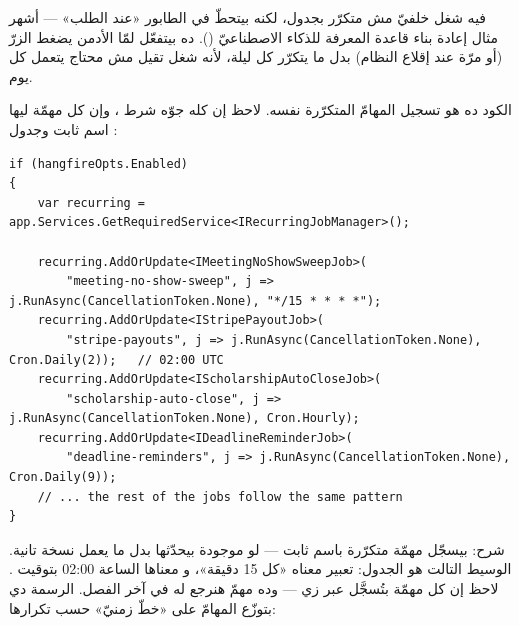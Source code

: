 \begin{note}
فيه شغل خلفيّ مش متكرّر بجدول، لكنه بيتحطّ في الطابور «عند الطلب» — أشهر مثال إعادة بناء
قاعدة المعرفة للذكاء الاصطناعيّ (). ده بيتفعّل لمّا الأدمن يضغط
الزرّ (أو مرّة عند إقلاع النظام) بدل ما يتكرّر كل ليلة، لأنه شغل تقيل مش محتاج يتعمل كل يوم.
\end{note}

الكود ده هو تسجيل المهامّ المتكرّرة نفسه. لاحظ إن كله جوّه شرط ،
وإن كل مهمّة ليها اسم ثابت وجدول :

\begin{english}
\begin{lstlisting}[language={[Sharp]C}]
if (hangfireOpts.Enabled)
{
    var recurring = app.Services.GetRequiredService<IRecurringJobManager>();

    recurring.AddOrUpdate<IMeetingNoShowSweepJob>(
        "meeting-no-show-sweep", j => j.RunAsync(CancellationToken.None), "*/15 * * * *");
    recurring.AddOrUpdate<IStripePayoutJob>(
        "stripe-payouts", j => j.RunAsync(CancellationToken.None), Cron.Daily(2));   // 02:00 UTC
    recurring.AddOrUpdate<IScholarshipAutoCloseJob>(
        "scholarship-auto-close", j => j.RunAsync(CancellationToken.None), Cron.Hourly);
    recurring.AddOrUpdate<IDeadlineReminderJob>(
        "deadline-reminders", j => j.RunAsync(CancellationToken.None), Cron.Daily(9));
    // ... the rest of the jobs follow the same pattern
}
\end{lstlisting}
\end{english}

شرح:  بيسجّل مهمّة متكرّرة باسم ثابت — لو موجودة بيحدّثها بدل ما يعمل
نسخة تانية. الوسيط التالت هو الجدول:  تعبير  معناه «كل 15
دقيقة»، و معناها الساعة 02:00 بتوقيت . لاحظ إن كل مهمّة بتُسجَّل
عبر  زي  — وده مهمّ هنرجع له في آخر الفصل. الرسمة دي
بتوزّع المهامّ على «خطّ زمنيّ» حسب تكرارها:

\begin{center}\begin{LTR}
\end{LTR}\end{center}

